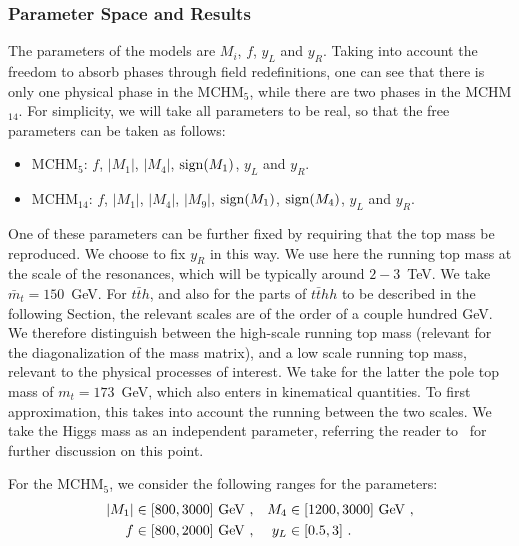 \subsubsection{Parameter Space and Results}
\label{analysis}
The parameters of the models are $M_i$, $f$, $y_L$ and $y_R$.  Taking
into account the freedom to absorb phases through field redefinitions,
one can see that there is only one physical phase in the MCHM$_5$,
while there are two phases in the MCHM$_{14}$.  For simplicity, we
will take all parameters to be real, so that the free parameters can be
taken as follows:
\begin{itemize}
\item MCHM$_5$: $f$, $|M_1|$, $|M_4|$, ${\rm sign}(M_1)$, $y_L$ and $y_R$.
\item MCHM$_{14}$: $f$, $|M_1|$, $|M_4|$, $|M_9|$, ${\rm sign}(M_1)$, ${\rm sign}(M_4)$, $y_L$ and $y_R$.
\end{itemize}
One of these parameters can be further fixed by requiring that the top
mass be reproduced.  We choose to fix $y_R$ in this way.  We use here
the running top mass at the scale of the resonances, which will be
typically around $2-3$~TeV. We take $\bar{m}_t = 150$~GeV. For
$t\bar{t}h$, and also for the parts of $t\bar{t}hh$ to be described in
the following Section, the relevant scales are of the order of a
couple hundred GeV. We therefore distinguish between the high-scale
running top mass (relevant for the diagonalization of the mass
matrix), and a low scale running top mass, relevant to the physical
processes of interest.  We take for the latter the pole top mass of
$m_t = 173$~GeV, which also enters in kinematical quantities.  To
first approximation, this takes into account the running between the
two scales.  We take the Higgs mass as an independent parameter,
referring the reader to~\cite{MCHMtthh} for further discussion on this
point.

For the MCHM$_5$, we consider the following ranges for the parameters:
\begin{align*}
|M_1|& \in [800, 3000]~{\rm GeV}~, &  M_4 &\in [1200, 3000]~{\rm GeV}~,  \\
f&\in [800, 2000]~{\rm GeV}~,          &  y_L&\in [0.5, 3] ~.
\end{align*}


